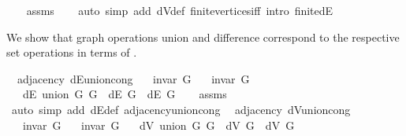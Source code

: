 \begin{isabellebody}
%
\isadelimproof
\ \ %
\endisadelimproof
%
\isatagproof
{}\isamarkupfalse%
\ assms\isanewline
\ \ \isamarkupfalse%
\ {\isacharparenleft}{\kern0pt}auto\ simp\ add{\isacharcolon}{\kern0pt}\ dV{\isacharunderscore}{\kern0pt}def\ finite{\isacharunderscore}{\kern0pt}vertices{\isacharunderscore}{\kern0pt}iff\ intro{\isacharcolon}{\kern0pt}\ finite{\isacharunderscore}{\kern0pt}dE{\isacharparenright}{\kern0pt}%
\endisatagproof
{\isafoldproof}%
%
\isadelimproof
%
\endisadelimproof
%
\begin{isamarkuptext}%
We show that graph operations union and difference correspond to the respective set operations in
terms of .%
\end{isamarkuptext}\isamarkuptrue%
\isamarkupfalse%
\ {\isacharparenleft}{\kern0pt}\ adjacency{\isacharparenright}{\kern0pt}\ dE{\isacharunderscore}{\kern0pt}union{\isacharunderscore}{\kern0pt}cong{\isacharcolon}{\kern0pt}\isanewline
\ \ \ {\isachardoublequoteopen}invar\ G{}{\isachardoublequoteclose}\isanewline
\ \ \ {\isachardoublequoteopen}invar\ G{}{\isachardoublequoteclose}\isanewline
\ \ \ {\isachardoublequoteopen}dE\ {\isacharparenleft}{\kern0pt}union\ G{}\ G{}{\isacharparenright}{\kern0pt}\ {\isacharequal}{\kern0pt}\ dE\ G{}\ {\isasymunion}\ dE\ G{}{\isachardoublequoteclose}\isanewline
%
\isadelimproof
\ \ %
\endisadelimproof
%
\isatagproof
{}\isamarkupfalse%
\ assms\isanewline
\ \ \isamarkupfalse%
\ {\isacharparenleft}{\kern0pt}auto\ simp\ add{\isacharcolon}{\kern0pt}\ dE{\isacharunderscore}{\kern0pt}def\ adjacency{\isacharunderscore}{\kern0pt}union{\isacharunderscore}{\kern0pt}cong{\isacharparenright}{\kern0pt}%
\endisatagproof
{\isafoldproof}%
%
\isadelimproof
\isanewline
%
\endisadelimproof
\isanewline
{}\isamarkupfalse%
\ {\isacharparenleft}{\kern0pt}\ adjacency{\isacharparenright}{\kern0pt}\ dV{\isacharunderscore}{\kern0pt}union{\isacharunderscore}{\kern0pt}cong{\isacharcolon}{\kern0pt}\isanewline
\ \ \ {\isachardoublequoteopen}invar\ G{}{\isachardoublequoteclose}\isanewline
\ \ \ {\isachardoublequoteopen}invar\ G{}{\isachardoublequoteclose}\isanewline
\ \ \ {\isachardoublequoteopen}dV\ {\isacharparenleft}{\kern0pt}union\ G{}\ G{}{\isacharparenright}{\kern0pt}\ {\isacharequal}{\kern0pt}\ dV\ G{}\ {\isasymunion}\ dV\ G{}{\isachardoublequoteclose}\isanewline

\end{isabellebody}
